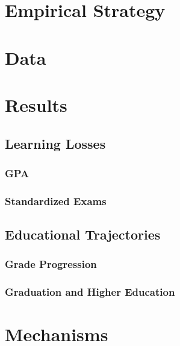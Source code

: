 
\section{Empirical Strategy}\label{sec:empirical_strategy}


\section{Data}\label{sec:data}

\section{Results}\label{sec:results}

\subsection{Learning Losses}

\subsubsection{GPA}

\subsubsection{Standardized Exams}

\subsection{Educational Trajectories}

\subsubsection{Grade Progression}

\subsubsection{Graduation and Higher Education}


\section{Mechanisms}\label{sec:mechanisms}

